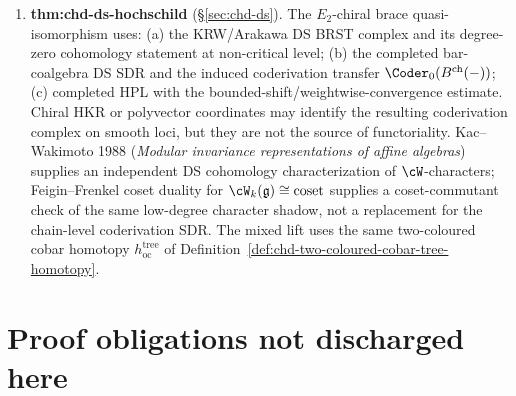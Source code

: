 \begin{enumerate}
\item \textbf{thm:chd-ds-hochschild} (\S\ref{sec:chd-ds}).
The $E_2$-chiral brace quasi-isomorphism uses:
(a) the KRW/Arakawa DS BRST complex and its degree-zero cohomology
statement at non-critical level; (b) the completed bar-coalgebra
DS SDR and the induced coderivation transfer
\(\Coder_0(B^{\mathrm{ch}}(-))\); (c) completed HPL with the
bounded-shift/weightwise-convergence estimate. Chiral HKR or
polyvector coordinates may identify the resulting coderivation complex
on smooth loci, but they are not the source of functoriality.
Kac--Wakimoto 1988 (\emph{Modular invariance representations of
affine algebras}) supplies an independent DS cohomology
characterization of $\cW$-characters; Feigin--Frenkel coset duality
for $\cW_k(\fg) \cong \mathrm{coset}$ supplies a coset-commutant
check of the same low-degree character shadow, not a replacement for
the chain-level coderivation SDR. The mixed lift uses the same
two-coloured cobar homotopy
\(h_{\mathrm{oc}}^{\mathrm{tree}}\) of
Definition~\ref{def:chd-two-coloured-cobar-tree-homotopy}.
\end{enumerate}

\section{Proof obligations not discharged here}
\label{sec:chd-not-proved}

